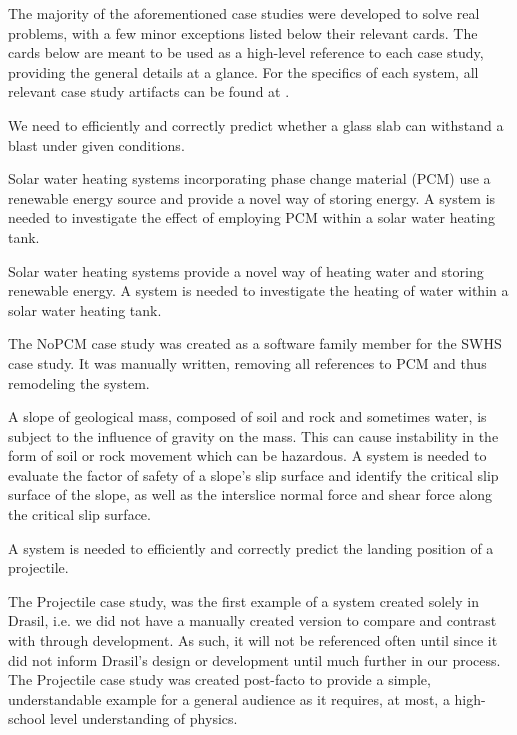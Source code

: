 The majority of the aforementioned case studies were developed to solve real
problems, with a few minor exceptions listed below their relevant cards.
The cards below are meant to be used as a high-level reference to each case 
study, providing the general details at a glance. For the specifics of each 
system, all relevant case study artifacts can be found at .

\card{\gb}
{We need to efficiently and correctly predict whether a glass 
slab can withstand a blast under given conditions.}
{}

\card{\sw}
{Solar water heating systems incorporating phase change 
 material (PCM) use a renewable energy source and provide a novel way of 
 storing energy. A system is needed to investigate the effect of employing PCM
 within a solar water heating tank.}
{}

\card{\np}
{Solar water heating systems provide a novel way of 
heating water and storing renewable energy. A system is needed to investigate
the heating of water within a solar water heating tank.}
{}

The NoPCM case study was created as a software family member for the SWHS case
study. It was manually written, removing all references to PCM and thus 
remodeling the system.

\card{\sp}
{A slope of geological mass, composed of soil and rock 
 and sometimes water, is subject to the influence of gravity on the mass. 
 This can cause instability in the form of soil or rock movement which can
 be hazardous. A system is needed to evaluate the factor of safety of 
 a slope's slip surface and identify the critical slip surface of the slope, 
 as well as the interslice normal force and shear force along the critical 
 slip surface.}
{}

\card{\pr}
{A system is needed to efficiently and correctly predict
 the landing position of a projectile.}
{}

The Projectile case study, was the first example of a system 
created solely in Drasil, i.e. we did not have a manually created version to 
compare and contrast with through development. As such, it will not be 
referenced often until  since it did not inform Drasil's 
design or development until much further in our process. The Projectile case 
study was created post-facto to provide a simple, understandable example for a 
general audience as it requires, at most, a high-school level understanding of 
physics. 

